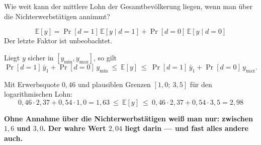 \begin{aufgabe}
Wie weit kann der mittlere Lohn der Gesamtbevölkerung liegen, wenn man über die Nichterwerbstätigen  annimmt?

\loesung
{}
\[ \mathbb{E}[y] = \Pr[d=1]\,\mathbb{E}[y\mid d=1] + \Pr[d=0]\,\mathbb{E}[y\mid d=0] \]
Der letzte Faktor ist unbeobachtet.

Liegt $y$ sicher in $[y_{\min},y_{\max}]$, so gilt
\[ \Pr[d=1]\,\bar y_1 + \Pr[d=0]\,y_{\min} \ \le\ \mathbb{E}[y] \ \le\ \Pr[d=1]\,\bar y_1 + \Pr[d=0]\,y_{\max} . \]

Mit Erwerbsquote $0{,}46$ und plausiblen Grenzen $[1{,}0;\ 3{,}5]$ für den logarithmischen Lohn:
\[ 0{,}46\cdot2{,}37 + 0{,}54\cdot1{,}0 = 1{,}63 \ \le\ \mathbb{E}[y] \ \le\ 0{,}46\cdot2{,}37+0{,}54\cdot3{,}5 = 2{,}98 \]

\begin{center}
\begin{minipage}{0.9\textwidth}
\textbf{Ohne Annahme über die Nichterwerbstätigen weiß man nur: zwischen $1{,}6$ und $3{,}0$. Der wahre Wert $2{,}04$ liegt darin --- und fast alles andere auch.}
\end{minipage}
\end{center}

\begin{center}
\begin{minipage}{0.88\textwidth}
\end{minipage}
\end{center}
\end{aufgabe}


